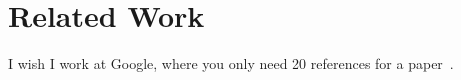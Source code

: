 \section{Related Work}
\label{sec:related}

I wish I work at Google, where you only need 20 references for a paper~\cite{gfs:sosp03}.


